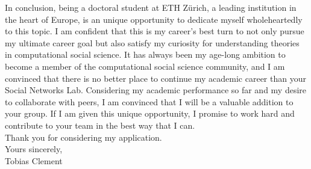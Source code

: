 In conclusion, being a doctoral student at ETH Zürich, a leading institution in the heart of Europe, is an unique opportunity to dedicate myself wholeheartedly to this topic. 
I am confident that this is my career's best turn to not only pursue my ultimate career goal but also satisfy my curiosity for understanding theories in computational social science. 
It has always been my age-long ambition to become a member of the computational social science community, and I am convinced that there is no better place to continue my academic career than your Social Networks Lab. 
Considering my academic performance so far and my desire to collaborate with peers, I am convinced that I will be a valuable addition to your group. 
If I am given this unique opportunity, I promise to work hard and contribute to your team in the best way that I can.\\

Thank you for considering my application.\\

Yours sincerely,\\
Tobias Clement\\\\\
